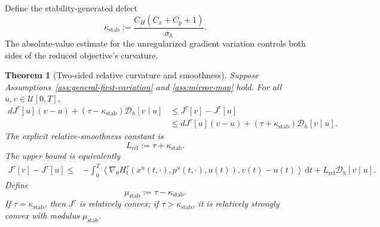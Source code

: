 \documentclass[11pt]{amsart}
\numberwithin{equation}{section} %
\newcommand{\dd}{\mathrm{d}}
\newtheorem{theorem}{Theorem}[section]
\theoremstyle{remark}
\begin{document}
Define the stability-generated defect
\begin{equation}
\label{eq:kappa-stab-general}
\kappa_{\mathrm{stab}}:=\frac{C_H(C_x+C_p+1)}{\sigma_h}.
\end{equation}
The absolute-value estimate for the unregularized gradient variation
controls both sides of the reduced objective's curvature.

\begin{theorem}[Two-sided relative curvature and smoothness]
\label{thm:ensemble-relative-smoothness}
Suppose Assumptions~\ref{ass:general-first-variation} and
\ref{ass:mirror-map} hold. For all $u,v\in\mathcal U[0,T]$,
\begin{equation}
\label{eq:ensemble-relative-smoothness}
\begin{aligned}
dJ^\tau[u](v-u)+(\tau-\kappa_{\mathrm{stab}})\mathcal D_h[v\mid u]
&\le J^\tau[v]-J^\tau[u]\\
&\le dJ^\tau[u](v-u)+(\tau+\kappa_{\mathrm{stab}})\mathcal D_h[v\mid u].
\end{aligned}
\end{equation}
The explicit relative-smoothness constant is
\begin{equation}
\label{eq:Lrel-general}
L_{\mathrm{rel}}:=\tau+\kappa_{\mathrm{stab}}.
\end{equation}
The upper bound is equivalently
\begin{align}
\label{eq:ensemble-relative-smoothness-H}
J^\tau[v]-J^\tau[u]\le{}&-\int_0^T\left\langle
\nabla_\theta H_t^\tau(x^u(t,\cdot),p^u(t,\cdot),u(t)),
v(t)-u(t)\right\rangle\,\dd t +L_{\mathrm{rel}}\mathcal D_h[v\mid u].
\end{align}
Define
\begin{equation}
\label{eq:mu-stab-general}
\mu_{\mathrm{stab}}:=\tau-\kappa_{\mathrm{stab}}.
\end{equation}
If $\tau=\kappa_{\mathrm{stab}}$, then $J^\tau$ is relatively convex;
if $\tau>\kappa_{\mathrm{stab}}$, it is relatively strongly convex
with modulus $\mu_{\mathrm{stab}}$.
\end{theorem}
\end{document}
